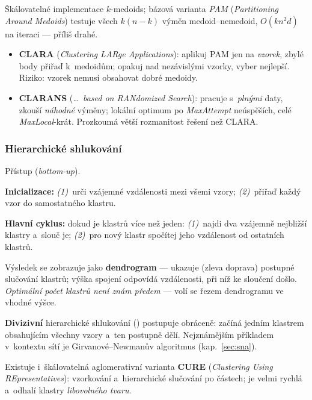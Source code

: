 \documentclass[11pt,a4paper]{article}
\theoremstyle{definition}
\begin{document}
\begin{defbox}
Škálovatelné implementace $k$-medoids; bázová varianta \emph{PAM} (\emph{Partitioning Around
Medoids}) testuje všech $k(n-k)$ výměn medoid--nemedoid, $O(kn^2d)$ na iteraci ---
příliš drahé.
\begin{itemize}
\item \textbf{CLARA} (\emph{Clustering LARge Applications}): aplikuj PAM jen na
      \emph{vzorek}, zbylé body přiřaď k~medoidům; opakuj nad nezávislými vzorky, vyber
      nejlepší. Riziko: vzorek nemusí obsahovat dobré medoidy.
\item \textbf{CLARANS} (\emph{\dots\ based on RANdomized Search}): pracuje s~\emph{plnými}
      daty, zkouší \emph{náhodné} výměny; lokální optimum po \emph{MaxAttempt} neúspěších,
      celé \emph{MaxLocal}-krát. Prozkoumá větší rozmanitost řešení než CLARA.
\end{itemize}
\end{defbox}

\subsubsection{Hierarchické shlukování}

\begin{defbox}
Přístup  (\emph{bottom-up}).

\textbf{Inicializace:} \emph{(1)}~urči vzájemné vzdálenosti mezi všemi vzory;
\emph{(2)}~přiřaď každý vzor do samostatného klastru.

\textbf{Hlavní cyklus:} dokud je klastrů více než jeden: \emph{(1)}~najdi dva vzájemně
nejbližší klastry a~slouč je; \emph{(2)}~pro nový klastr spočítej jeho vzdálenost od
ostatních klastrů.

Výsledek se zobrazuje jako \textbf{dendrogram} --- ukazuje (zleva doprava) postupné slučování
klastrů; výška spojení odpovídá vzdálenosti, při níž ke sloučení došlo. \emph{Optimální počet
klastrů není znám předem} --- volí se řezem dendrogramu ve vhodné výšce.
\end{defbox}

\textbf{Divizivní} hierarchické shlukování () postupuje obráceně: začíná
jedním klastrem obsahujícím všechny vzory a~ten postupně dělí. Nejznámějším příkladem
v~kontextu sítí je Girvanové--Newmanův algoritmus (kap.~\ref{sec:sna}).

Existuje i~škálovatelná aglomerativní varianta \textbf{CURE} (\emph{Clustering Using
REpresentatives}): vzorkování a~hierarchické slučování po částech; je velmi rychlá a~odhalí
klastry \emph{libovolného tvaru}.
\end{document}
